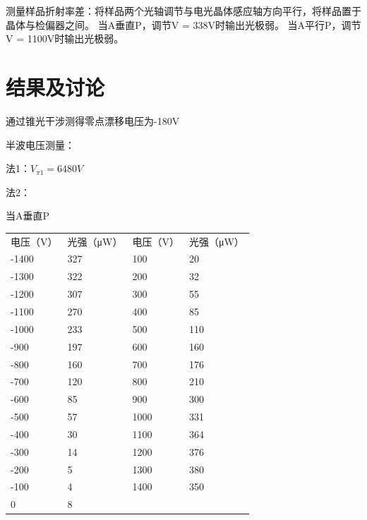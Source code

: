\documentclass[font=default]{mpltx}
\begin{document}
测量样品折射率差：将样品两个光轴调节与电光晶体感应轴方向平行，将样品置于晶体与检偏器之间。
当A垂直P，调节V = 338V时输出光极弱。
当A平行P，调节V = 1100V时输出光极弱。



\section{结果及讨论}
通过锥光干涉测得零点漂移电压为-180V

半波电压测量：

法1：$V_{\pi1} = 6480V$

法2：

当A垂直P

\begin{table}[]
\begin{tabular}{llll}
电压（V）                      & 光强（μW）                   & 电压（V） & 光强（μW） \\
-1400                      & 327                      & 100   & 20     \\
-1300                      & 322                      & 200   & 32     \\
-1200                      & 307                      & 300   & 55     \\
-1100                      & 270                      & 400   & 85     \\
-1000                      & 233                      & 500   & 110    \\
-900                       & 197                      & 600   & 160    \\ \cline{1-2}
\multicolumn{1}{|l|}{-800} & \multicolumn{1}{l|}{160} & 700   & 176    \\ \cline{1-2}
-700                       & 120                      & 800   & 210    \\
-600                       & 85                       & 900   & 300    \\
-500                       & 57                       & 1000  & 331    \\
-400                       & 30                       & 1100  & 364    \\
-300                       & 14                       & 1200  & 376    \\
-200                       & 5                        & 1300  & 380    \\
-100                       & 4                        & 1400  & 350    \\
0                          & 8                        &       &       
\end{tabular}
\end{table}
\end{document}

